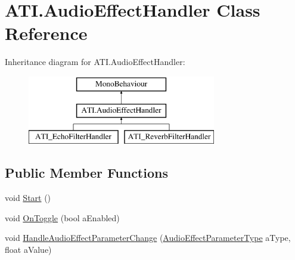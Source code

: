 \hypertarget{class_a_t_i_1_1_audio_effect_handler}{}\section{A\+T\+I.\+Audio\+Effect\+Handler Class Reference}
\label{class_a_t_i_1_1_audio_effect_handler}
Inheritance diagram for A\+T\+I.\+Audio\+Effect\+Handler\+:\begin{figure}[H]
\begin{center}
\leavevmode
\includegraphics[height=3.000000cm]{class_a_t_i_1_1_audio_effect_handler}
\end{center}
\end{figure}
\subsection*{Public Member Functions}
\begin{DoxyCompactItemize}
\item 
void \hyperlink{class_a_t_i_1_1_audio_effect_handler_ad47b6cefdd2bab8bec233069269e76e4}{Start} ()
\item 
void \hyperlink{class_a_t_i_1_1_audio_effect_handler_aa698c6c69066c8e3f2caa9beeea51569}{On\+Toggle} (bool a\+Enabled)
\item 
void \hyperlink{class_a_t_i_1_1_audio_effect_handler_a298f455be06ae16a870fa291337a77c6}{Handle\+Audio\+Effect\+Parameter\+Change} (\hyperlink{class_a_t_i_a1123d61b8dceb5867a3683e8d2224ee1}{Audio\+Effect\+Parameter\+Type} a\+Type, float a\+Value)
\end{DoxyCompactItemize}
